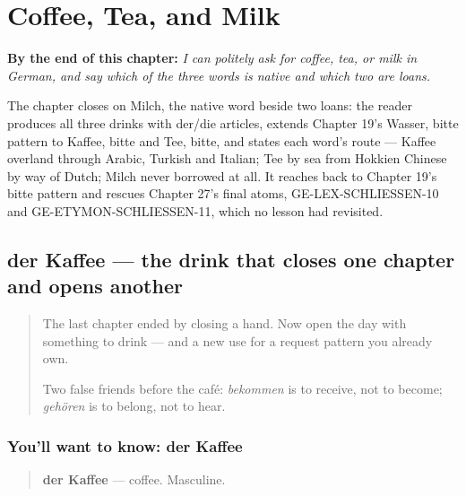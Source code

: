
\chapter{Coffee, Tea, and Milk}
\label{ch:ge-coffee-tea-milk}

\begin{chapteropening}
\textbf{By the end of this chapter:} \emph{I can politely ask for coffee, tea, or milk in German, and say which of the three words is native and which two are loans.}

The chapter closes on Milch, the native word beside two loans: the reader produces all three drinks with der/die articles, extends Chapter 19's Wasser, bitte pattern to Kaffee, bitte and Tee, bitte, and states each word's route — Kaffee overland through Arabic, Turkish and Italian; Tee by sea from Hokkien Chinese by way of Dutch; Milch never borrowed at all. It reaches back to Chapter 19's bitte pattern and rescues Chapter 27's final atoms, GE-LEX-SCHLIESSEN-10 and GE-ETYMON-SCHLIESSEN-11, which no lesson had revisited.
\end{chapteropening}

\section[der Kaffee]{der Kaffee — the drink that closes one chapter and opens another}

\label{lesson:GE-C28-kaffee}



\begin{quote}
The last chapter ended by closing a hand. Now open the day with something to drink — and a new use for a request pattern you already own.

Two false friends before the café: \emph{bekommen} is to receive, not to become; \emph{gehören} is to belong, not to hear.
\end{quote}

\subsection*{You'll want to know: der Kaffee}
\begin{quote}
\textbf{der Kaffee} — coffee. Masculine.
\end{quote}

